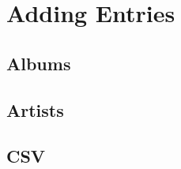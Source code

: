 \chapter{Adding Entries}
\section{Albums}
\label{sect:albums}
\section{Artists}
\section{CSV}
\label{sect:csv}